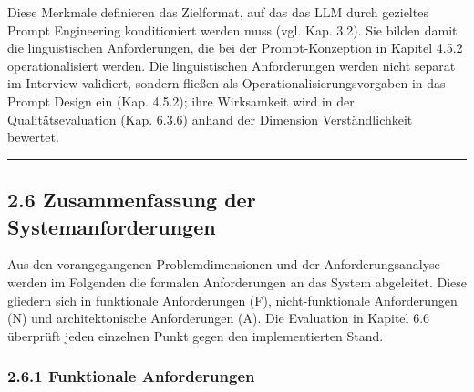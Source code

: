Diese Merkmale definieren das Zielformat, auf das das LLM durch
gezieltes Prompt Engineering konditioniert werden muss (vgl. Kap. 3.2).
Sie bilden damit die linguistischen Anforderungen, die bei der
Prompt-Konzeption in Kapitel 4.5.2 operationalisiert werden. Die
linguistischen Anforderungen werden nicht separat im Interview
validiert, sondern fließen als Operationalisierungsvorgaben in das
Prompt Design ein (Kap. 4.5.2); ihre Wirksamkeit wird in der
Qualitätsevaluation (Kap. 6.3.6) anhand der Dimension Verständlichkeit
bewertet.

\begin{center}\rule{0.5\linewidth}{0.5pt}\end{center}

\subsection{2.6 Zusammenfassung der
Systemanforderungen}\label{zusammenfassung-der-systemanforderungen}

Aus den vorangegangenen Problemdimensionen und der Anforderungsanalyse
werden im Folgenden die formalen Anforderungen an das System abgeleitet.
Diese gliedern sich in funktionale Anforderungen (F), nicht-funktionale
Anforderungen (N) und architektonische Anforderungen (A). Die Evaluation
in Kapitel 6.6 überprüft jeden einzelnen Punkt gegen den implementierten
Stand.

\subsubsection{2.6.1 Funktionale
Anforderungen}\label{funktionale-anforderungen}

